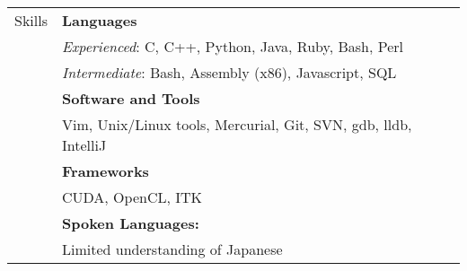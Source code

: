 \documentclass[11pt]{article}
\begin{document}
\begin{tabular}{p{0.75in} p{5.45in}}
        

    {Skills} &
        \textbf{Languages} \\ &
        \qquad \textit{Experienced}: C, C++, Python, Java, Ruby, Bash, Perl \\ &
        \qquad \textit{Intermediate}: Bash, Assembly (x86), Javascript, SQL \\ & \vspace{0.015in}
        \textbf{Software and Tools} \\ &
        \qquad Vim, Unix/Linux tools, Mercurial, Git, SVN, gdb, lldb, IntelliJ \\ & \vspace{0.015in}
        \textbf{Frameworks} \\ &
        \qquad CUDA, OpenCL, ITK \\ & \vspace{0.015in}
        \textbf{Spoken Languages:} \\ &
        \qquad Limited understanding of Japanese \\
\end{tabular}
\end{document}
